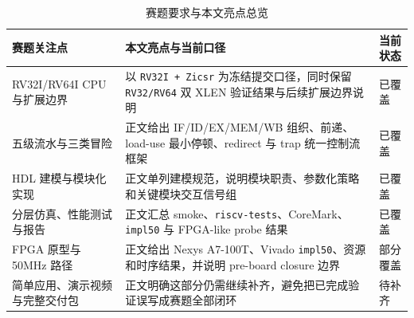 \begin{table}[H]
    \centering
    \small
    \caption{赛题要求与本文亮点总览}
    \begin{tabularx}{0.95\textwidth}{L{0.25\textwidth} Y L{0.15\textwidth}}
        \toprule
        赛题关注点 & 本文亮点与当前口径 & 当前状态 \\
        \midrule
        RV32I/RV64I CPU 与扩展边界 & 以 \texttt{RV32I + Zicsr} 为冻结提交口径，同时保留 \texttt{RV32/RV64} 双 XLEN 验证结果与后续扩展边界说明 & 已覆盖 \\
        五级流水与三类冒险 & 正文给出 IF/ID/EX/MEM/WB 组织、前递、load-use 最小停顿、redirect 与 trap 统一控制流框架 & 已覆盖 \\
        HDL 建模与模块化实现 & 正文单列建模规范，说明模块职责、参数化策略和关键模块交互信号组 & 已覆盖 \\
        分层仿真、性能测试与报告 & 正文汇总 smoke、\texttt{riscv-tests}、CoreMark、\texttt{impl50} 与 FPGA-like probe 结果 & 已覆盖 \\
        FPGA 原型与 50MHz 路径 & 正文给出 Nexys A7-100T、Vivado \texttt{impl50}、资源和时序结果，并说明 pre-board closure 边界 & 部分覆盖 \\
        简单应用、演示视频与完整交付包 & 正文明确这部分仍需继续补齐，避免把已完成验证误写成赛题全部闭环 & 待补齐 \\
        \bottomrule
    \end{tabularx}
\end{table}

\clearpage
